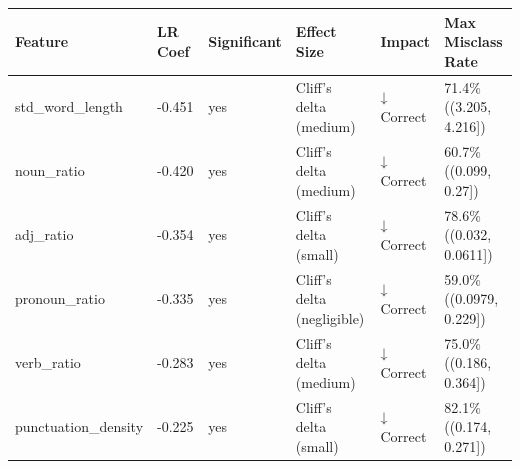 \begin{tabular}{llllll}
\toprule
Feature & LR Coef & Significant & Effect Size & Impact & Max Misclass Rate \\
\midrule
std\_word\_length & -0.451 & yes & Cliff's delta (medium) & ↓ Correct & 71.4\% ((3.205, 4.216]) \\
noun\_ratio & -0.420 & yes & Cliff's delta (medium) & ↓ Correct & 60.7\% ((0.099, 0.27]) \\
adj\_ratio & -0.354 & yes & Cliff's delta (small) & ↓ Correct & 78.6\% ((0.032, 0.0611]) \\
pronoun\_ratio & -0.335 & yes & Cliff's delta (negligible) & ↓ Correct & 59.0\% ((0.0979, 0.229]) \\
verb\_ratio & -0.283 & yes & Cliff's delta (medium) & ↓ Correct & 75.0\% ((0.186, 0.364]) \\
punctuation\_density & -0.225 & yes & Cliff's delta (small) & ↓ Correct & 82.1\% ((0.174, 0.271]) \\
\bottomrule
\end{tabular}

